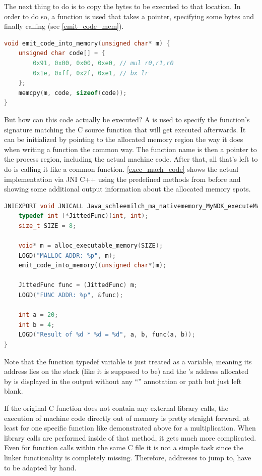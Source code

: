 The next thing to do is to copy the bytes to be executed to that location. In order to do so, a function is used that takes a pointer, specifying some bytes and finally calling  (see \autoref{emit_code_mem}).
\begin{lstlisting}[language=C++, caption=emit\_code\_into\_memory(), label=emit_code_mem]
void emit_code_into_memory(unsigned char* m) {
    unsigned char code[] = {
        0x91, 0x00, 0x00, 0xe0, // mul r0,r1,r0
        0x1e, 0xff, 0x2f, 0xe1, // bx lr
    };
    memcpy(m, code, sizeof(code));
}
\end{lstlisting}
But how can this code actually be executed?
A  is used to specify the function's signature matching the C source function that will get executed afterwards.
It can be initialized by pointing to the allocated memory region the way it does when writing a function the common way. The function name is then a pointer to the process region, including the actual machine code.
After that, all that's left to do is calling it like a common function.
\autoref{exec_mach_code} shows the actual implementation via JNI C++ using the predefined methods from before and showing some additional output information about
the allocated memory spots.\newpage
\begin{lstlisting}[language=C++, caption=executeMachineCode(), label=exec_mach_code]
JNIEXPORT void JNICALL Java_schleemilch_ma_nativememory_MyNDK_executeMachineCode (JNIEnv *env, jobject obj){
    typedef int (*JittedFunc)(int, int);
    size_t SIZE = 8;

    void* m = alloc_executable_memory(SIZE);
    LOGD("MALLOC ADDR: %p", m);
    emit_code_into_memory((unsigned char*)m);

    JittedFunc func = (JittedFunc) m;
    LOGD("FUNC ADDR: %p", &func);

    int a = 20;
    int b = 4;
    LOGD("Result of %d * %d = %d", a, b, func(a, b));
}
\end{lstlisting}
Note that the function typedef variable  is just treated as a variable,
meaning its address lies on the stack (like it is supposed to be)
and the 's address allocated by  is displayed in the  output without any ``'' annotation or path but just left blank.

If the original C function does not contain any external library calls, the execution
of machine code directly out of memory is pretty straight forward, at least for one
specific function like demonstrated above for a multiplication. When library calls are performed inside of that method, it gets much more complicated. Even for function calls
within the same C file it is not a simple task since the linker functionality is
completely missing. Therefore, addresses to jump to,
have to be adapted by hand.

